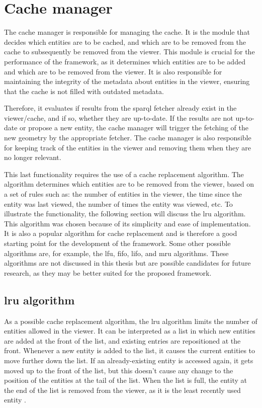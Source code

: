 \section{Cache manager}
The cache manager is responsible for managing the cache. It is the module that decides which entities are to be cached, and which are to be removed from the cache to subsequently be removed from the viewer. This module is crucial for the performance of the framework, as it determines which entities are to be added and which are to be removed from the viewer. It is also responsible for maintaining the integrity of the metadata about entities in the viewer, ensuring that the cache is not filled with outdated metadata.

Therefore, it evaluates if results from the \ac{sparql} fetcher already exist in the viewer/cache, and if so, whether they are up-to-date. If the results are not up-to-date or propose a new entity, the cache manager will trigger the fetching of the new geometry by the appropriate fetcher. The cache manager is also responsible for keeping track of the entities in the viewer and removing them when they are no longer relevant.

This last functionality requires the use of a cache replacement algorithm. The algorithm determines which entities are to be removed from the viewer, based on a set of rules such as: the number of entities in the viewer, the time since the entity was last viewed, the number of times the entity was viewed, etc. To illustrate the functionality, the following section will discuss the \ac{lru} algorithm. This algorithm was chosen because of its simplicity and ease of implementation. It is also a popular algorithm for cache replacement and is therefore a good starting point for the development of the framework. Some other possible algorithms are, for example, the \ac{lfu}, \ac{fifo}, \ac{lifo}, and \ac{mru} algorithms\parencite{cacheAlgorigthms}. These algorithms are not discussed in this thesis but are possible candidates for future research, as they may be better suited for the proposed framework.

\subsection{\acs{lru} algorithm}
As a possible cache replacement algorithm, the \ac{lru} algorithm limits the number of entities allowed in the viewer. It can be interpreted as a list in which new entities are added at the front of the list, and existing entries are repositioned at the front. Whenever a new entity is added to the list, it causes the current entities to move further down the list. If an already-existing entity is accessed again, it gets moved up to the front of the list, but this doesn't cause any change to the position of the entities at the tail of the list. When the list is full, the entity at the end of the list is removed from the viewer, as it is the least recently used entity \parencite{cacheAlgorigthms}.

